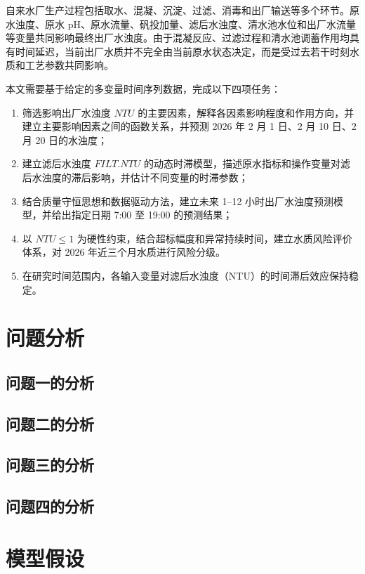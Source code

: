 \documentclass[UTF8,zihao=-4]{ctexart}
\begin{document}
自来水厂生产过程包括取水、混凝、沉淀、过滤、消毒和出厂输送等多个环节。原水浊度、原水 pH、原水流量、矾投加量、滤后水浊度、清水池水位和出厂水流量等变量共同影响最终出厂水浊度。由于混凝反应、过滤过程和清水池调蓄作用均具有时间延迟，当前出厂水质并不完全由当前原水状态决定，而是受过去若干时刻水质和工艺参数共同影响。

本文需要基于给定的多变量时间序列数据，完成以下四项任务：
\begin{enumerate}[label=（\arabic*）]
  \item 筛选影响出厂水浊度 $NTU$ 的主要因素，解释各因素影响程度和作用方向，并建立主要影响因素之间的函数关系，并预测 2026 年 2 月 1 日、2 月 10 日、2 月 20 日的水浊度；
  \item 建立滤后水浊度 $FILT.NTU$ 的动态时滞模型，描述原水指标和操作变量对滤后水浊度的滞后影响，并估计不同变量的时滞参数；
  \item 结合质量守恒思想和数据驱动方法，建立未来 1--12 小时出厂水浊度预测模型，并给出指定日期 7:00 至 19:00 的预测结果；
  \item 以 $NTU\leq 1$ 为硬性约束，结合超标幅度和异常持续时间，建立水质风险评价体系，对 2026 年近三个月水质进行风险分级。
  \item 在研究时间范围内，各输入变量对滤后水浊度（NTU）的时间滞后效应保持稳定。
\end{enumerate}

\section{问题分析}
\subsection{问题一的分析}

\subsection{问题二的分析}

\subsection{问题三的分析}

\subsection{问题四的分析}

\section{模型假设}
\end{document}
